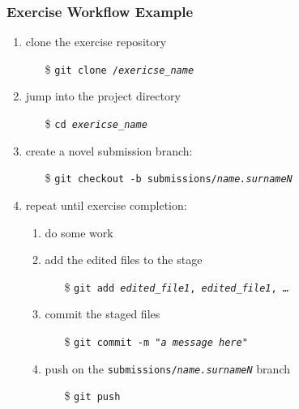 \documentclass[presentation]{beamer}\mode<presentation>{\usetheme{AMSBolognaFC}}
\begin{document}
\begin{frame}[allowframebreaks]
\frametitle{Exercise Workflow Example}

    \begin{enumerate}
        \item clone the exercise repository
        \begin{itemize}
            \item[\$] \texttt{git clone \gitlabGroup/\alert{\textit{exericse\_name}}}
        \end{itemize}

        \item jump into the project directory
        \begin{itemize}
            \item[\$] \texttt{cd \alert{\textit{exericse\_name}}}
        \end{itemize}

        \item create a novel submission branch:
        \begin{itemize}
            \item[\$] \texttt{git checkout -b submissions/\textit{\alert{name.surnameN}}}
        \end{itemize}

        \item repeat until exercise completion:
        \begin{enumerate}
            \item do some work
            \item add the edited files to the stage
            \begin{itemize}
                \item[\$] \texttt{git add \textit{\alert{edited\_file1}}, \textit{\alert{edited\_file1}}, \ldots}
            \end{itemize}
            \item commit the staged files
            \begin{itemize}
                \item[\$] \texttt{git commit -m "\textit{\alert{a message here}}"}
            \end{itemize}
            \item push on the \texttt{submissions/\textit{\alert{name.surnameN}}} branch
            \begin{itemize}
                \item[\$] \texttt{git \alert{push}}
            \end{itemize}
        \end{enumerate}

    \end{enumerate}

\end{frame}
\end{document}
